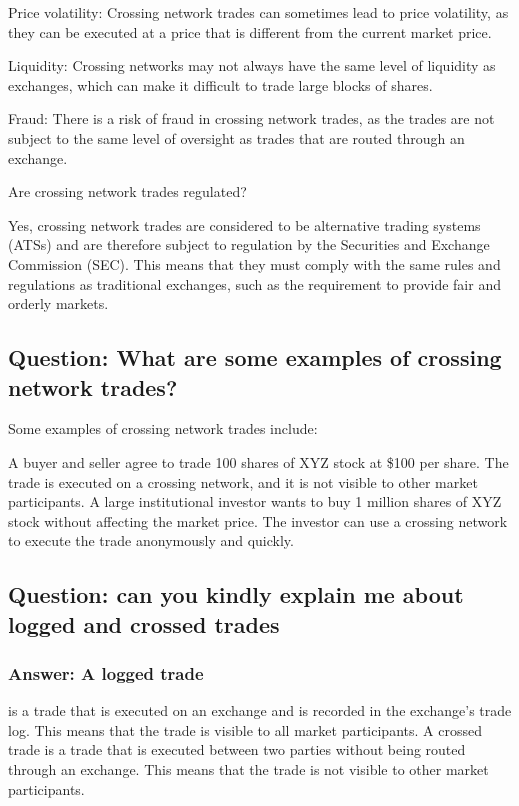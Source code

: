 \documentclass[11pt]{article}
\begin{document}
Price volatility: Crossing network trades can sometimes lead to price volatility, as they can be executed at a price that is different from the current market price.

Liquidity: Crossing networks may not always have the same level of liquidity as exchanges, which can make it difficult to trade large blocks of shares.

Fraud: There is a risk of fraud in crossing network trades, as the trades are not subject to the same level of oversight as trades that are routed through an exchange.

Are crossing network trades regulated?

Yes, crossing network trades are considered to be alternative trading systems (ATSs) and are therefore subject to regulation by the Securities and Exchange Commission (SEC). This means that they must comply with the same rules and regulations as traditional exchanges, such as the requirement to provide fair and orderly markets.

\subsection{Question: What are some examples of crossing network trades?}
\label{sec:org611bb38}
Some examples of crossing network trades include:

A buyer and seller agree to trade 100 shares of XYZ stock at \$100 per share. The trade is executed on a crossing network, and it is not visible to other market participants.
A large institutional investor wants to buy 1 million shares of XYZ stock without affecting the market price. The investor can use a crossing network to execute the trade anonymously and quickly.

\subsection{Question: can you kindly explain me about logged and crossed trades}
\label{sec:org28eb84b}

\subsubsection{Answer: A logged trade}
\label{sec:orga94c78c}
is a trade that is executed on an exchange and is recorded in the exchange's trade log. This means that the trade is visible to all market participants. A crossed trade is a trade that is executed between two parties without being routed through an exchange. This means that the trade is not visible to other market participants.
\end{document}
